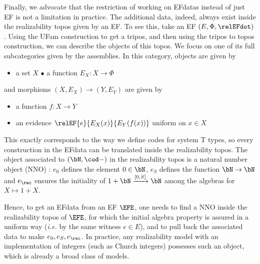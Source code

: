 Finally, we advocate that the restriction of working on EFdatas instead of just EF is not a limitation in practice. The additional data, indeed, always exist inside the realizability topos given by an EF.
To see this, take an EF $(E,\Phi,\relEFdot)$. Using the UFam construction \cite{CohMiqTat21,JacobsCLTT} to get a tripos, and then using the tripos to topos construction, we can describe the objects of this topos. We focus on one of its full subcategories given by the assemblies. In this category, objects are given by
\begin{itemize}
\item a set $X$\hspace{2cm}
$\bullet$ a function $E_X : X \to \Phi$
\end{itemize}
and morphisms $(X,E_X) \to (Y,E_Y)$ are given by
\begin{itemize}
\item a function $f : X \to Y$
\item an evidence $\relEF{e}{E_X(x)}{E_Y(f(x))}$ uniform on $x \in X$
\end{itemize}
This exactly corresponds to the way we define codes for system T types, so every construction in the EFdata can be translated inside the realizability topos. The object associated to $(\bN,\cod -)$ in the realizability topos is a natural number object (NNO) \cite{Lawvere1963}: $e_0$ defines the element $0 \in \bN$, $e_S$ defines the function $\bN \to \bN$ and $e_{\rec}$ ensures the initiality of $1+\bN \xrightarrow{[0,S]} \bN$ among the algebras for $X\mapsto 1+X$.


Hence, to get an EFdata from an EF $\EFE$, one needs to find a NNO inside the realizability topos of $\EFE$, for which the initial algebra property is assured in a uniform way (\textit{i.e.} by the same witness $e \in E$), and to pull back the associated data to make $e_0,e_S,e_{\rec}$. In practice, any realizability model with an implementation of integers (such as Church integers) possesses such an object, which is already a broad class of models.

